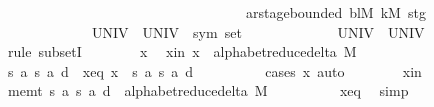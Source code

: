 \begin{isabellebody}
\ \ \ \ \ \ \ \ \ \ \ \ \ \ \ \ \ \ \ \ \ \ \ \ \ \ \ \ \ \ \ \ \ \ {\isasymand}\ ar{\isacharunderscore}{\kern0pt}stage{\isacharunderscore}{\kern0pt}bounded\ bl\isactrlsub M\ k\isactrlsub M\ stg{\isacharbraceright}{\kern0pt}{\isacharparenright}{\kern0pt}\isanewline
\ \ \ \ \ \ \ \ \ \ \ \ {\isasymtimes}\ {\isacharparenleft}{\kern0pt}UNIV\ {\isasymrightarrow}\ {\isacharparenleft}{\kern0pt}UNIV\ {\isacharcolon}{\kern0pt}{\isacharcolon}{\kern0pt}\ sym{}\ set{\isacharparenright}{\kern0pt}{\isacharparenright}{\kern0pt}\isanewline
\ \ \ \ \ \ \ \ \ \ \ \ {\isasymtimes}\ {\isacharparenleft}{\kern0pt}UNIV\ {\isasymrightarrow}\ UNIV{\isacharparenright}{\kern0pt}{\isachardoublequoteclose}\isanewline
\ \ \ \ \isamarkupfalse%
\ {\isacharparenleft}{\kern0pt}rule\ subsetI{\isacharparenright}{\kern0pt}\isanewline
\ \ \ \ \ \ \isamarkupfalse%
\ x\ \isamarkupfalse%
\ xin{\isacharcolon}{\kern0pt}\ {\isachardoublequoteopen}x\ {\isasymin}\ alphabet{\isacharunderscore}{\kern0pt}reduce{\isacharunderscore}{\kern0pt}delta\ M{\isachardoublequoteclose}\isanewline
\ \ \ \ \ \ \isamarkupfalse%
\ s\ a\ s{\isacharprime}{\kern0pt}\ a{\isacharprime}{\kern0pt}\ d\ \ x{\isacharunderscore}{\kern0pt}eq{\isacharcolon}{\kern0pt}\ {\isachardoublequoteopen}x\ {\isacharequal}{\kern0pt}\ {\isacharparenleft}{\kern0pt}s{\isacharcomma}{\kern0pt}\ a{\isacharcomma}{\kern0pt}\ s{\isacharprime}{\kern0pt}{\isacharcomma}{\kern0pt}\ a{\isacharprime}{\kern0pt}{\isacharcomma}{\kern0pt}\ d{\isacharparenright}{\kern0pt}{\isachardoublequoteclose}\isanewline
\ \ \ \ \ \ \ \ \isamarkupfalse%
\ {\isacharparenleft}{\kern0pt}cases\ x{\isacharparenright}{\kern0pt}\ auto\isanewline
\ \ \ \ \ \ \isamarkupfalse%
\ xin\ \isamarkupfalse%
\ mem{\isacharunderscore}{\kern0pt}t{\isacharcolon}{\kern0pt}\ {\isachardoublequoteopen}{\isacharparenleft}{\kern0pt}s{\isacharcomma}{\kern0pt}\ a{\isacharcomma}{\kern0pt}\ s{\isacharprime}{\kern0pt}{\isacharcomma}{\kern0pt}\ a{\isacharprime}{\kern0pt}{\isacharcomma}{\kern0pt}\ d{\isacharparenright}{\kern0pt}\ {\isasymin}\ alphabet{\isacharunderscore}{\kern0pt}reduce{\isacharunderscore}{\kern0pt}delta\ M{\isachardoublequoteclose}\isanewline
\ \ \ \ \ \ \ \ \isamarkupfalse%
\ x{\isacharunderscore}{\kern0pt}eq\ \isamarkupfalse%
\ simp\isanewline
\ \ \ \ \ \ %
\isanewline
\ \ \ \ \ \ \isamarkupfalse%

\end{isabellebody}
